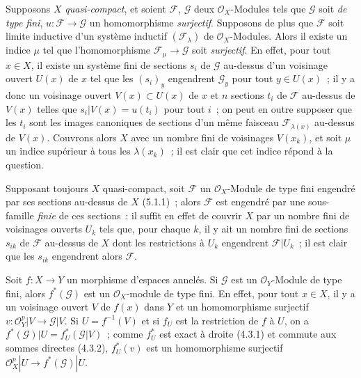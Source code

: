 \begin{env}[5.2.3]
\label{0.5.2.3-fr}
Supposons $X$ \emph{quasi-compact}, et soient $\mathcal{F}$, $\mathcal{G}$ deux
$\mathcal{O}_X$-Modules tels que $\mathcal{G}$ soit \emph{de type fini},
$u:\mathcal{F}\to\mathcal{G}$ un homomorphisme \emph{surjectif}. Supposons de
plus que $\mathcal{F}$ soit limite inductive d'un système inductif
$(\mathcal{F}_\lambda)$ de $\mathcal{O}_X$-Modules. Alors il existe un indice
$\mu$ tel que l'homomorphisme $\mathcal{F}_\mu\to\mathcal{G}$ soit
\emph{surjectif}. En effet, pour tout $x\in X$, il existe un système fini de
sections $s_i$ de $\mathcal{G}$ au-dessus d'un voisinage ouvert $U(x)$ de $x$
tel que les $(s_i)_y$ engendrent $\mathcal{G}_y$ pour tout $y\in U(x)$~; il y
a donc un voisinage ouvert $V(x)\subset U(x)$ de $x$ et $n$ sections $t_i$ de
$\mathcal{F}$ au-dessus de $V(x)$ telles que
$s_i|V(x)=u(t_i)$ pour tout $i$~; on peut en outre supposer que les $t_i$ sont
les images canoniques de sections d'un même faisceau
$\mathcal{F}_{\lambda(x)}$ au-dessus de $V(x)$. Couvrons alors $X$ avec un
nombre fini de voisinages $V(x_k)$, et soit $\mu$ un indice supérieur à tous
les $\lambda(x_k)$~; il est clair que cet indice répond à la question.

Supposant toujours $X$ quasi-compact, soit $\mathcal{F}$ un
$\mathcal{O}_X$-Module de type fini engendré par ses sections au-dessus de $X$
(5.1.1)~; alors $\mathcal{F}$ est engendré par une sous-famille \emph{finie}
de ces sections~: il suffit en effet de couvrir $X$ par un nombre fini de
voisinages ouverts $U_k$ tels que, pour chaque $k$, il y ait un nombre fini de
sections $s_{ik}$ de $\mathcal{F}$ au-dessus de $X$ dont les restrictions à
$U_k$ engendrent $\mathcal{F}|U_k$~; il est clair que les $s_{ik}$ engendrent
alors $\mathcal{F}$.
\end{env}

\begin{env}[5.2.4]
\label{0.5.2.4-fr}
Soit $f:X\to Y$ un morphisme d'espaces annelés. Si $\mathcal{G}$ est un
$\mathcal{O}_Y$-Module de type fini, alors $f^*(\mathcal{G})$ est un
$\mathcal{O}_X$-module de type fini. En effet, pour tout $x\in X$, il y a un
voisinage ouvert $V$ de $f(x)$ dans $Y$ et un homomorphisme surjectif
$v:\mathcal{O}_Y^p|V\to\mathcal{G}|V$. Si $U=f^{-1}(V)$ et si $f_U$ est la
restriction de $f$ à $U$, on a
$f^*(\mathcal{G})|U=f_U^*(\mathcal{G}|V)$~; comme $f_U^*$ est exact à droite
(4.3.1) et commute aux sommes directes (4.3.2), $f_U^*(v)$ est un
homomorphisme surjectif
$\mathcal{O}_X^p|U\to f^*(\mathcal{G})|U$.
\end{env}

